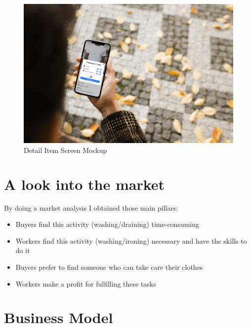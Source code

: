 \begin{figure}[hbtp]
\caption{Detail Item Screen Mockup}
\centering
\includegraphics[scale=0.1]{../Images/mockup01.jpg}
\end{figure}
\section{A look into the market}
By doing a market analysis I obtained those main pillars:
\begin{itemize}
\item Buyers find this activity (washing/draining) time-consuming
\item Workers find this activity (washing/ironing) necessary and  have the skills to do it
\item Buyers prefer to find  someone who can take care their clothes
\item Workers make a profit for fulfilling these tasks
\end{itemize}
\section{Business Model}